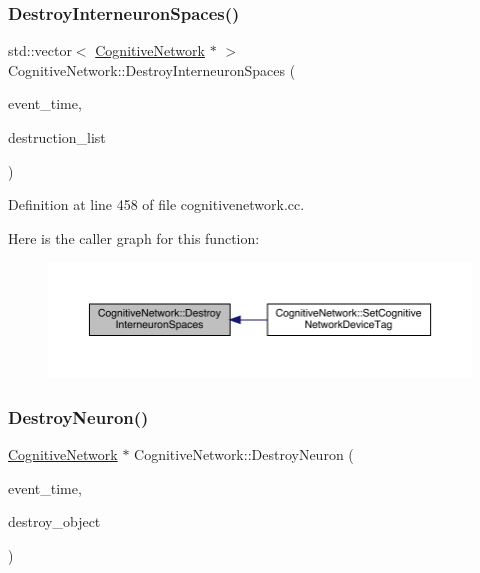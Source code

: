 \subsubsection{\texorpdfstring{Destroy\+Interneuron\+Spaces()}{DestroyInterneuronSpaces()}}
{\footnotesize\ttfamily std\+::vector$<$ \hyperlink{class_cognitive_network}{Cognitive\+Network} $\ast$ $>$ Cognitive\+Network\+::\+Destroy\+Interneuron\+Spaces (\begin{DoxyParamCaption}\item[{std\+::chrono\+::time\+\_\+point$<$ \hyperlink{universe_8h_a0ef8d951d1ca5ab3cfaf7ab4c7a6fd80}{Clock} $>$}]{event\+\_\+time,  }\item[{std\+::vector$<$ \hyperlink{class_cognitive_network}{Cognitive\+Network} $\ast$$>$}]{destruction\+\_\+list }\end{DoxyParamCaption})}



Definition at line 458 of file cognitivenetwork.\+cc.

Here is the caller graph for this function\+:
\nopagebreak
\begin{figure}[H]
\begin{center}
\leavevmode
\includegraphics[width=350pt]{class_cognitive_network_a718833496332e0471186c9a886005c4a_icgraph}
\end{center}
\end{figure}
\mbox{\label{class_cognitive_network_ab3318f517da206ad4286b6cc22acf520}} 
\subsubsection{\texorpdfstring{Destroy\+Neuron()}{DestroyNeuron()}}
{\footnotesize\ttfamily \hyperlink{class_cognitive_network}{Cognitive\+Network} $\ast$ Cognitive\+Network\+::\+Destroy\+Neuron (\begin{DoxyParamCaption}\item[{std\+::chrono\+::time\+\_\+point$<$ \hyperlink{universe_8h_a0ef8d951d1ca5ab3cfaf7ab4c7a6fd80}{Clock} $>$}]{event\+\_\+time,  }\item[{\hyperlink{class_cognitive_network}{Cognitive\+Network} $\ast$}]{destroy\+\_\+object }\end{DoxyParamCaption})}



